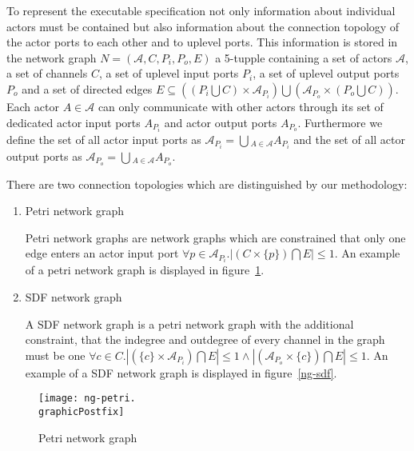 To represent the executable specification not only information about
individual actors must be contained but also information about
the connection topology of the actor ports to each other and to uplevel ports.
This information is stored in the network graph \label{network-graph}
$N=(\mathcal{A},C,P_{i},P_{o},E)$ a 5-tupple containing
a set of actors $\mathcal{A}$, a set of channels $C$, a set of uplevel
input ports $P_{i}$, a set of uplevel output ports $P_{o}$ and a set of
directed edges $E \subseteq ((P_{i} \bigcup C) \times \mathcal{A}_{P_{i}})
\bigcup (\mathcal{A}_{P_{o}} \times (P_{o} \bigcup C))$.
Each actor $A \in \mathcal{A}$ can only communicate with other actors
through its set of dedicated actor input ports $A_{P_{i}}$ and
actor output ports $A_{P_{o}}$.
Furthermore we define the set of all
actor input ports as $\mathcal{A}_{P_{i}} = \bigcup{}_{A \in \mathcal{A}} A_{P_{i}}$ and
the set of all actor output ports as
$\mathcal{A}_{P_{o}} = \bigcup{}_{A \in \mathcal{A}} A_{P_{o}}$.

There are two connection topologies which are distinguished by our methodology:

\begin{enumerate}
\item Petri network graph \label{petri-network-graph}

  Petri network graphs are network graphs which are constrained that only
  one edge enters an actor input port
  $\forall{p \in \mathcal{A}_{P_{i}}.} |(C \times \{p\}) \bigcap E| \le 1$.
  An example of a petri network graph is displayed in figure~\ref{ng-petri}.

\item SDF network graph \label{sdf-network-graph}

  A SDF network graph is a petri network graph with the additional constraint,
  that the indegree and outdegree of every channel in the graph must be one
  $\forall{c \in C.} |(\{c\} \times \mathcal{A}_{P_{i}}) \bigcap E| \le 1 \wedge
                    |(\mathcal{A}_{P_{o}} \times \{c\}) \bigcap E| \le 1$.
  An example of a SDF network graph is displayed in figure~\ref{ng-sdf}.
\end{enumerate}

\begin{figure}
\centering
\texttt{[image: ng-petri.\\graphicPostfix]}\\
\caption{\label{ng-petri}Petri network graph}
\end{figure}

